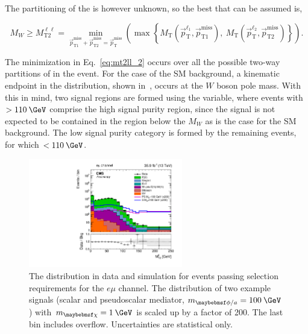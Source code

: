 The partitioning of the \ptvecmiss is however unknown, so the best that can be assumed is, 

\begin{equation}
  M_{W} \geq M_{\text{T2}}^{\ell\ell} = \min_{\vec{p}^{\text{miss}}_{\text{T1}}+\vec{p}^{\text{miss}}_{\text{T2}}=\vec{p}^{\text{miss}}_{\text{T}}}\left(\max\left\{M_{\text{T}}\left(\vec{p}^{\ell_1}_{\text{T}},\vec{p}^{\text{miss}}_{\text{T1}}\right),\:M_{\text{T}}\left(\vec{p}^{\ell_2}_{\text{T}},\vec{p}^{\text{miss}}_{\text{T2}}\right)\right\}\right).
\label{eq:mt2ll_2}
\end{equation}

The minimization in Eq.~\ref{eq:mt2ll_2} occurs over all the possible two-way partitions of \ptvecmiss in the event. For the case of the SM \ttll background, a kinematic endpoint in the \mttll distribution, shown in~, occurs at the $W$ boson pole mass. With this in mind, two signal regions are formed using the \mttll variable, where events with \mttll$>110\:\GeV$ comprise the high signal purity region, since the signal is not expected to be contained in the region below the $M_W$ as is the case for the SM \ttll background. The low signal purity category is formed by the remaining events, for which \mttll$<110\:\GeV$.

\begin{figure}
  \includegraphics[width=0.6\textwidth]{figs/mt2log_em.pdf}
  \caption{The \mttll distribution in data and simulation for events passing selection requirements for the $e\mu$ channel. The distribution of two example signals (scalar and pseudoscalar mediator, $m_{\phi/a} = 100\:\GeV$) with $m_{\chi}=1\:\GeV$ is scaled up by a factor of 200. The last bin includes overflow. Uncertainties are statistical only.}
  \label{fig:mt2ll}
\end{figure}



